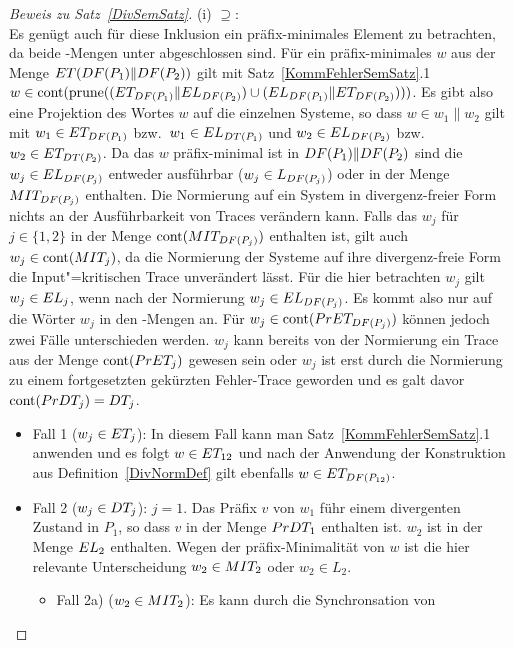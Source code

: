 \begin{proof}[Beweis zu Satz~\ref{DivSemSatz}]
  (i) \glqq $\supseteq$\grqq{}:\\
  Es genügt auch für diese Inklusion ein präfix-minimales Element zu
  betrachten, da beide \ET{}-Mengen unter \cont{} abgeschlossen sind. Für ein
  präfix-minimales $w$ aus der Menge $ET (DF (P_1)\|DF (P_2))$ gilt mit
  Satz~\ref{KommFehlerSemSatz}.1 $w\in \mathrm{cont} (\mathrm{prune} ((ET _{DF (P_1)}\|EL
  _{DF (P_2)})\cup (EL _{DF (P_1)}\|ET _{DF (P_2)})))$. Es gibt also
  eine Projektion des Wortes $w$ auf die einzelnen Systeme, so dass $w\in w_1\|
  w_2$ gilt mit $w_1\in ET _{DF (P_1)}$ bzw.\ $w_1\in EL _{DT (P_1)}$ und
  $w_2\in EL _{DF (P_2)}$ bzw.\ $w_2\in ET _{DT (P_2)}$. Da das $w$
  präfix-minimal ist in $DF (P_1)\|DF (P_2)$ sind die $w_j\in EL _{DF
  (P_j)}$ entweder ausführbar ($w_j\in L _{DF (P_j)}$) oder in der Menge $MIT
  _{DF (P_j)}$ enthalten. Die Normierung auf ein System in divergenz-freier
  Form nichts an der Ausführbarkeit von Traces verändern kann. Falls das $w_j$
  für $j\in\{1,2\}$ in der Menge $\mathrm{cont} (MIT _{DF (P_j)})$ enthalten ist,
  gilt auch $w_j\in\mathrm{cont} (MIT _j)$, da die Normierung der Systeme auf
  ihre divergenz-freie Form die Input"=kritischen Trace unverändert lässt. Für
  die hier betrachten $w_j$ gilt $w_j\in EL _j$, wenn nach der Normierung
  $w_j\in EL _{DF (P_j)}$. Es kommt also nur auf die Wörter $w_j$ in den
  \ET{}-Mengen an. Für $w_j\in\mathrm{cont} (PrET _{DF (P_j)})$ können jedoch zwei
  Fälle unterschieden werden. $w_j$ kann bereits von der Normierung ein Trace
  aus der Menge $\mathrm{cont} (PrET _j)$ gewesen sein oder $w_j$ ist erst durch die
  Normierung zu einem fortgesetzten gekürzten Fehler-Trace geworden und es galt
  davor $\mathrm{cont} (PrDT _j) = DT _j$.
  \begin{itemize}
    \item Fall 1 ($w_j\in ET _j$): In diesem Fall kann man
      Satz~\ref{KommFehlerSemSatz}.1 anwenden und es folgt $w\in ET _{12}$ und
      nach der Anwendung der Konstruktion aus Definition~\ref{DivNormDef} gilt
      ebenfalls $w\in ET _{DF (P_{12})}$.
    \item Fall 2 ($w_j\in DT _j$): \OBdA{} $j=1$. Das Präfix $v$ von $w_1$ führ
      einem divergenten Zustand in $P_1$, so dass $v$ in der Menge $PrDT _1$
      enthalten ist. $w_2$ ist in der Menge $EL _2$ enthalten. Wegen der
      präfix-Minimalität von $w$ ist die hier relevante Unterscheidung
      $w_2\in MIT _2$ oder $w_2\in L_2$.
      \begin{itemize}
        \item Fall 2a) ($w_2\in MIT _2$): Es kann durch die Synchronsation von

\end{itemize}
\end{itemize}
\end{proof}

